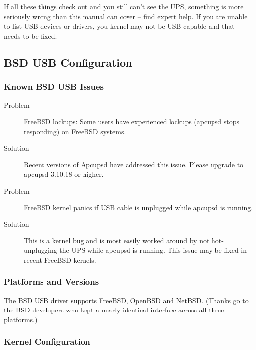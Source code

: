 If all these things check out and you still can't see the UPS, something is
more seriously wrong than this manual can cover {--} find expert help.  If you
are unable to list USB devices or drivers, you kernel may not be USB-capable
and that needs to be fixed.


\subsection*{BSD USB Configuration}

\subsubsection*{Known BSD USB Issues}

\begin{description}
\item [Problem]
FreeBSD lockups: Some users have experienced lockups (apcupsd stops 
responding) on FreeBSD systems.
\item [Solution]
Recent versions of Apcupsd have addressed
this issue. Please upgrade to apcupsd-3.10.18 or higher.

\item [Problem]
FreeBSD kernel panics if USB cable is unplugged while apcupsd is running. 
\item [Solution]
This is a kernel bug and is most easily worked around by not hot- 
unplugging the UPS while apcupsd is running. This issue may be fixed in
recent FreeBSD kernels.
\end{description}

\subsubsection*{Platforms and Versions}

The \*BSD USB driver supports FreeBSD, OpenBSD and NetBSD. (Thanks go to 
the \*BSD developers who kept a nearly identical interface across all 
three platforms.)

\subsubsection*{Kernel Configuration}

